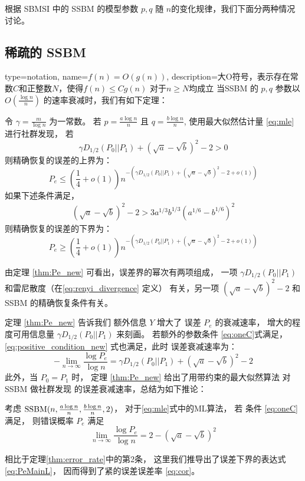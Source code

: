 根据 SBMSI 中的 SSBM 的模型参数 $p,q$ 随 $n$的变化规律，我们下面分两种情况讨论。
\subsection{稀疏的 SSBM }
{
  type=notation,
  name={$f(n)=O(g(n))$},
  description={大O符号，表示存在常数$C$和正整数$N$，使得$f(n)\leq C g(n)$ 对于$n\geq N$均成立}
}
当SSBM 的 $p,q$ 参数以 $O(\frac{ \log n}{n})$
的速率衰减时，我们有如下定理：
\begin{theorem}\label{thm:Pe_new}
    令
    $\gamma = \frac{ m}{\log n}$
    为一常数。
    若
    $p = \frac{a \log n }{n} $ 且 $q = 
    \frac{b \log n } {n}$, 使用最大似然估计量 \eqref{eq:mle}
    进行社群发现，
    若
    \begin{equation}\label{eq:positive_condition_new}
    \gamma D_{1/2}(P_0||P_1) +
     (\sqrt{a} - \sqrt{b})^2-2 > 0
    \end{equation}
    则精确恢复的误差的上界为：
    \begin{equation}\label{eq:PeMain}
    P_e \leq (\frac{1}{4}+o(1)) n^{-\left(\gamma D_{1/2}(P_0||P_1) + (\sqrt{a} - \sqrt{b})^2-2 + o(1)\right) }
    \end{equation}
    如果下述条件满足，
    \begin{align}
    (\sqrt{a}-\sqrt{b})^2-2 
    > 3a^{1/3}b^{1/3}(a^{1/6}-b^{1/6})^2\label{eq:oneC}
    \end{align}
    则精确恢复的误差的下界为：
    \begin{equation}\label{eq:PeMainL}
    P_e \geq (\frac{1}{4}+o(1)) n^{-\left(\gamma D_{1/2}(P_0||P_1) + (\sqrt{a} - \sqrt{b})^2-2 + o(1)\right)}
    \end{equation}
\end{theorem}

由定理 \ref{thm:Pe_new}
可看出，误差界的幂次有两项组成，
一项 $\gamma D_{1/2}(P_0||P_1) $ 
和雷尼散度（在\eqref{eq:renyi_divergence} 定义）
有关，另一项 $ (\sqrt{a} - \sqrt{b})^2-2 $
和 SSBM 的精确恢复条件有关。

定理
\ref{thm:Pe_new} 告诉我们
额外信息  $Y$  增大了 误差 $P_e$ 的衰减速率，
增大的程度可用信息量 $\gamma D_{1/2}(P_0||P_1)$ 
来刻画。
若额外的参数条件 \eqref{eq:oneC}式满足，
\eqref{eq:positive_condition_new} 式也满足，此时
误差衰减速率为：
$$
-\lim_{n\to \infty} \frac{\log P_e}{\log n}
= \gamma D_{1/2}(P_0||P_1) + (\sqrt{a} - \sqrt{b})^2-2
$$
此外，当 $P_0=P_1$ 时，
定理 \ref{thm:Pe_new} 
给出了用带约束的最大似然算法
对SSBM 做社群发现
的误差衰减速率，总结为如下推论：
\begin{corollary}\label{cor:sbm}
考虑
$\operatorname{SSBM}(n,\frac{a\log n}{n}, \frac{b \log n}{n}, 2)$，
对于\eqref{eq:mle}式中的ML算法， 
若 条件 \eqref{eq:oneC} 满足，
则错误概率 $P_e$ 满足
\begin{equation}\label{eq:cor}
\lim_{n\to \infty} \frac{\log P_e}{\log n} =2-(\sqrt{a} - \sqrt{b})^2
\end{equation}

\end{corollary}
相比于定理\ref{thm:error_rate}中的第2条，
这里我们推导出了误差下界的表达式 \eqref{eq:PeMainL}，
因而得到了紧的误差误差率 \eqref{eq:cor}。

